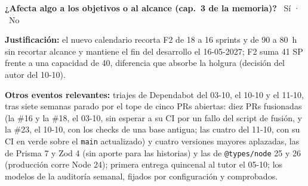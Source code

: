 \documentclass[11pt,a4paper]{article}
\begin{document}
\textbf{¿Afecta algo a los objetivos o al alcance (cap.~3 de la memoria)?} \checkbox\ Sí · \checkedbox\ No

\textbf{Justificación:} el nuevo calendario recorta F2 de 18 a 16 sprints y de 90 a 80~h sin recortar alcance y mantiene el fin del desarrollo el 16-05-2027; F2 suma 41 SP frente a una capacidad de 40, diferencia que absorbe la holgura (decisión del autor del 10-10).

\textbf{Otros eventos relevantes:} triajes de Dependabot del 03-10, el 10-10 y el 11-10, tras siete semanas parado por el tope de cinco PRs abiertas: diez PRs fusionadas (la \#16 y la \#18, el 03-10, sin esperar a su CI por un fallo del script de fusión, y la \#23, el 10-10, con los checks de una base antigua; las cuatro del 11-10, con su CI en verde sobre el \texttt{main} actualizado) y cuatro versiones mayores aplazadas, las de Prisma 7 y Zod 4 (sin aporte para las historias) y las de \texttt{@types/node} 25 y 26 (producción corre Node 24); primera entrega quincenal al tutor el 05-10; los modelos de la auditoría semanal, fijados por configuración y comprobados.
\end{document}
